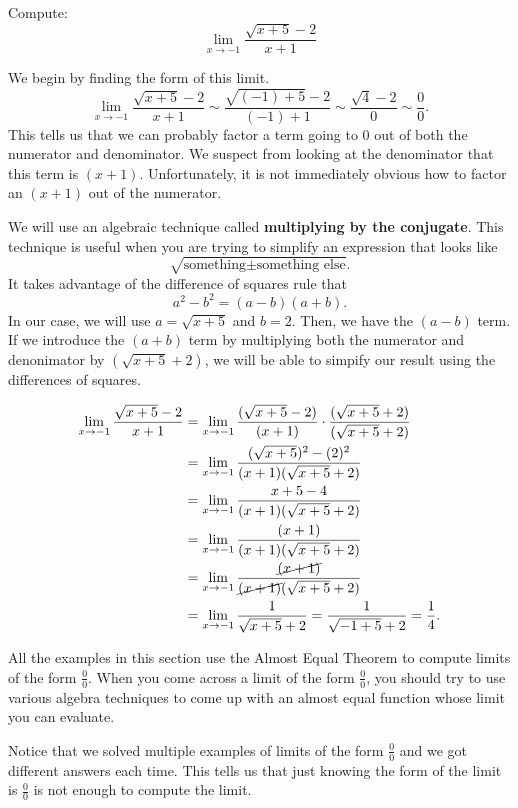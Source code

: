 \documentclass{ximera}
\begin{document}
\begin{example}
  Compute:
  \[
  \lim_{x\to-1} \frac{\sqrt{x+5}-2}{x+1}
  \]

\begin{explanation} 
  We begin by finding the form of this limit.
  \[
  \lim_{x\to-1} \frac{\sqrt{x+5}-2}{x+1} \sim \frac{\sqrt{(-1)+5}-2}{(-1)+1} \sim \frac{\sqrt{4}-2}{0} \sim \frac{0}{0}.
  \]
  This tells us that we can probably factor a term going to $0$ out of
  both the numerator and denominator.  We suspect from looking at the
  denominator that this term is $(x+1)$.  Unfortunately, it is not
  immediately obvious how to factor an $(x+1)$ out of the numerator.
 
  We will use an algebraic technique called \textbf{multiplying by the
    conjugate}.  This technique is useful when you are trying to
  simplify an expression that looks like
  \[
  \sqrt{\text{something} \pm \text{something else}}.
  \]
  It takes advantage of the difference of squares rule that
  \[
  a^2-b^2=(a-b)(a+b).
  \]
  In our case, we will use $a=\sqrt{x+5}$ and $b=2$.  Then, we have
  the $(a-b)$ term.  If we introduce the $(a+b)$ term by multiplying
  both the numerator and denonimator by $(\sqrt{x+5}+2)$, we will be
  able to simpify our result using the differences of squares.
 
\begin{align*}
\lim_{x\to-1} \frac{\sqrt{x+5}-2}{x+1}&=
\lim_{x\to-1} \frac{(\sqrt{x+5}-2)}{(x+1)} \cdot \frac{(\sqrt{x+5}+2)}{(\sqrt{x+5}+2)} \\
&=\lim_{x\to-1} \frac{(\sqrt{x+5})^2-(2)^2}{(x+1)(\sqrt{x+5}+2)} \\
&=\lim_{x\to-1} {x+5-4\over (x+1)(\sqrt{x+5}+2)} \\
&=\lim_{x\to-1} {(x+1)\over (x+1)(\sqrt{x+5}+2)} \\
&=\lim_{x\to-1} {\cancel{(x+1)}\over \cancel{(x+1)}(\sqrt{x+5}+2)} \\
&=\lim_{x\to-1} {1\over \sqrt{x+5}+2}= \frac{1}{\sqrt{-1+5}+2}={1\over4}.
\end{align*}
\end{explanation}
\end{example}

All the examples in this section use the Almost Equal Theorem to
compute limits of the form $\frac{0}{0}$.  When you come across a
limit of the form $\frac{0}{0}$, you should try to use various algebra
techniques to come up with an almost equal function whose limit you
can evaluate.

Notice that we solved multiple examples of limits of the form
$\frac{0}{0}$ and we got different answers each time.  This tells us
that just knowing the form of the limit is $\frac{0}{0}$ is not enough
to compute the limit.
\end{document}
